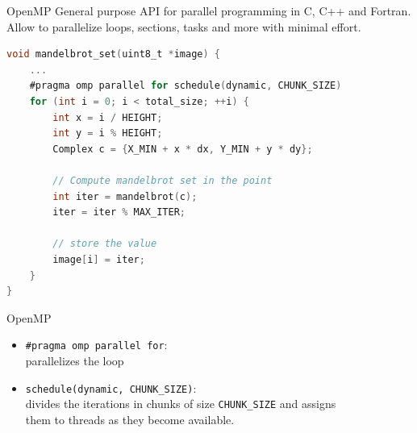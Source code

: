 %
%
\begin{frame}[fragile]{OpenMP}
    General purpose API for parallel programming in C, C++ and Fortran.
    Allow to parallelize loops, sections, tasks and more with minimal effort.
    \begin{lstlisting}[language=C, basicstyle=\fontsize{8}{9}\selectfont\ttfamily]
void mandelbrot_set(uint8_t *image) {
    ...
    #pragma omp parallel for schedule(dynamic, CHUNK_SIZE)
    for (int i = 0; i < total_size; ++i) {
        int x = i / HEIGHT;
        int y = i % HEIGHT;
        Complex c = {X_MIN + x * dx, Y_MIN + y * dy};

        // Compute mandelbrot set in the point
        int iter = mandelbrot(c);
        iter = iter % MAX_ITER;

        // store the value
        image[i] = iter;
    }
}
    \end{lstlisting}
\end{frame}
\begin{frame}[fragile]{OpenMP}
    \begin{itemize}
        \item \texttt{\#pragma omp parallel for}: \\
            \quad parallelizes the loop
        \item \texttt{schedule(dynamic, CHUNK\_SIZE)}: \\
            \quad divides the iterations
            in chunks of size \texttt{CHUNK\_SIZE} and assigns \\
            \quad them to threads
            as they become available.
    \end{itemize}
\end{frame}

